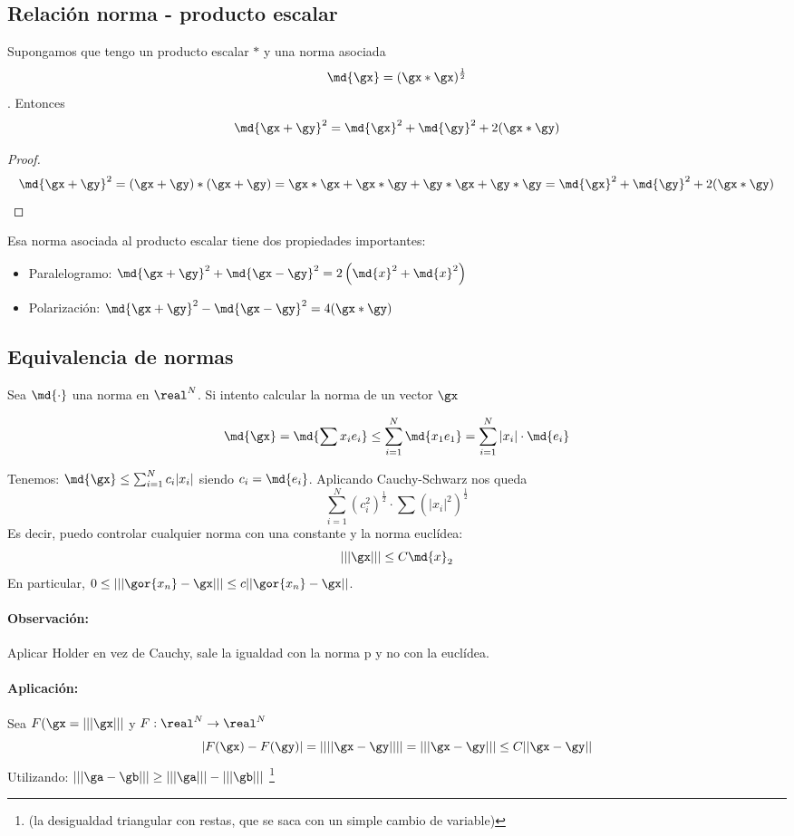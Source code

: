 \documentclass[a4paper,10pt]{apuntes}
\begin{document}
\subsection{Relación norma - producto escalar}
\label{secNormaprodEsc}
\begin{theorem}
Supongamos que tengo un producto escalar $\ast$ y una norma asociada \[ \md{\gx} = (\gx\ast \gx) ^ {\frac{1}{2}}\]. Entonces \[ \md{\gx + \gy}^ 2 =  \md{\gx} ^ 2 + \md{\gy} ^ 2+2(\gx\ast\gy) \]
\end{theorem}

\begin{proof}
\[ \md{\gx+\gy}^2 = (\gx+\gy)\ast(\gx+\gy) = \gx \ast \gx + \gx \ast \gy + \gy \ast \gx + \gy \ast \gy=\md{\gx} ^ 2 + \md{\gy} ^ 2+2(\gx\ast\gy) \]
\end{proof}

Esa norma asociada al producto escalar tiene dos propiedades importantes:
\begin{itemize}
\item Paralelogramo: $\md{\gx+\gy}^ 2 + \md{\gx-\gy} ^ 2 = 2\left(\md{x}^2+\md{x}^2\right) $
\item Polarización: $\md{\gx+\gy} ^ 2 - \md{\gx-\gy} ^ 2 = 4(\gx*\gy)$
\end{itemize}


\subsection{Equivalencia de normas}
Sea $\md{\cdot}$ una norma en $\real^N$. Si intento calcular la norma de un vector $\gx$

\[ \md{\gx} = \md{\sum x_i e_i} \leq \sum_{i=1}^N \md{x_1 e_1} = \sum_{i=1}^N|x_i|\cdot\md{e_i} \]

Tenemos: $\md{\gx} \leq \sum_{i=1}^N c_i |x_i|$ siendo $c_i = \md{e_i}$. Aplicando Cauchy-Schwarz  nos queda
\[ \sum_{i=1}^N \left(c_i^2\right)^\frac{1}{2} \cdot \sum \left(|x_i|^2\right)^\frac{1}{2} \]
Es decir, puedo controlar cualquier norma con una constante y la norma euclídea:
$$|||\gx||| \leq C \md{x}_{2}$$
En particular, $0 \leq |||\gor{x_n} - \gx|||\leq c ||\gor{x_n}-\gx||$. 

\paragraph{Observación:} Aplicar Holder en vez de Cauchy, sale la igualdad con la norma p y no con la euclídea.

\paragraph{Aplicación:}
Sea $F(\gx = |||\gx|||$ y $F:\real^N \rightarrow \real^N$ 
$$|F(\gx)-F(\gy)| = \left| |||\gx - \gy||| \right| = |||\gx - \gy||| \leq C ||\gx - \gy||$$
Utilizando: $|||\ga-\gb||| \ge |||\ga||| - |||\gb|||$ \footnote{(la desigualdad triangular con restas, que se saca con un simple cambio de variable)}
\end{document}
